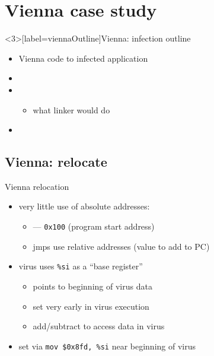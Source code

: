 \section{Vienna case study}

\begin{frame}<3>[label=viennaOutline]{Vienna: infection outline}
\begin{itemize}
\item Vienna  code to infected application
\vspace{.5cm}
\item {}
\item {}
    \begin{itemize}\item what linker would do\end{itemize}
\item {}
\end{itemize}
\end{frame}

\subsection{Vienna: relocate}

\begin{frame}[fragile,label=viennaReloc1]{Vienna relocation}
    \begin{itemize}
    \item very little use of absolute addresses:
        \begin{itemize}
        \item {} --- {\tt 0x100} (program start address)
        \item jmps use relative addresses (value to add to PC)
        \end{itemize}
    \item virus uses {\tt \%si} as a ``base register''
        \begin{itemize}
        \item points to beginning of virus data
        \item set very early in virus execution
        \item add/subtract to access data in virus
        \end{itemize}
    \item set via \lstinline|mov $0x8fd, %si| near beginning of virus
    \end{itemize}
\end{frame}

